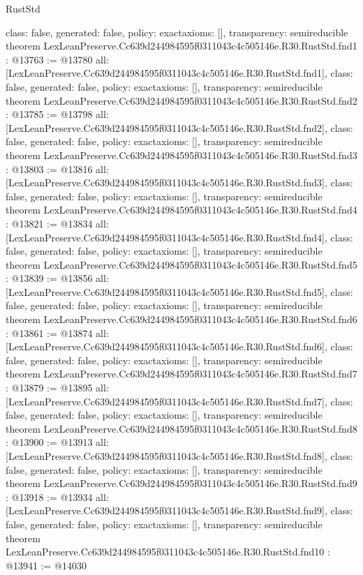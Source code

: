 \begin{lexlean}{RustStd}
\begin{coremodule}
{  class: false,
  generated: false,
  policy: exact{axioms: []},
  transparency: semireducible
}
theorem LexLeanPreserve.Cc639d244984595f0311043c4c505146e.R30.RustStd.fnd1 : @13763 := @13780 {
  all: [LexLeanPreserve.Cc639d244984595f0311043c4c505146e.R30.RustStd.fnd1],
  class: false,
  generated: false,
  policy: exact{axioms: []},
  transparency: semireducible
}
theorem LexLeanPreserve.Cc639d244984595f0311043c4c505146e.R30.RustStd.fnd2 : @13785 := @13798 {
  all: [LexLeanPreserve.Cc639d244984595f0311043c4c505146e.R30.RustStd.fnd2],
  class: false,
  generated: false,
  policy: exact{axioms: []},
  transparency: semireducible
}
theorem LexLeanPreserve.Cc639d244984595f0311043c4c505146e.R30.RustStd.fnd3 : @13803 := @13816 {
  all: [LexLeanPreserve.Cc639d244984595f0311043c4c505146e.R30.RustStd.fnd3],
  class: false,
  generated: false,
  policy: exact{axioms: []},
  transparency: semireducible
}
theorem LexLeanPreserve.Cc639d244984595f0311043c4c505146e.R30.RustStd.fnd4 : @13821 := @13834 {
  all: [LexLeanPreserve.Cc639d244984595f0311043c4c505146e.R30.RustStd.fnd4],
  class: false,
  generated: false,
  policy: exact{axioms: []},
  transparency: semireducible
}
theorem LexLeanPreserve.Cc639d244984595f0311043c4c505146e.R30.RustStd.fnd5 : @13839 := @13856 {
  all: [LexLeanPreserve.Cc639d244984595f0311043c4c505146e.R30.RustStd.fnd5],
  class: false,
  generated: false,
  policy: exact{axioms: []},
  transparency: semireducible
}
theorem LexLeanPreserve.Cc639d244984595f0311043c4c505146e.R30.RustStd.fnd6 : @13861 := @13874 {
  all: [LexLeanPreserve.Cc639d244984595f0311043c4c505146e.R30.RustStd.fnd6],
  class: false,
  generated: false,
  policy: exact{axioms: []},
  transparency: semireducible
}
theorem LexLeanPreserve.Cc639d244984595f0311043c4c505146e.R30.RustStd.fnd7 : @13879 := @13895 {
  all: [LexLeanPreserve.Cc639d244984595f0311043c4c505146e.R30.RustStd.fnd7],
  class: false,
  generated: false,
  policy: exact{axioms: []},
  transparency: semireducible
}
theorem LexLeanPreserve.Cc639d244984595f0311043c4c505146e.R30.RustStd.fnd8 : @13900 := @13913 {
  all: [LexLeanPreserve.Cc639d244984595f0311043c4c505146e.R30.RustStd.fnd8],
  class: false,
  generated: false,
  policy: exact{axioms: []},
  transparency: semireducible
}
theorem LexLeanPreserve.Cc639d244984595f0311043c4c505146e.R30.RustStd.fnd9 : @13918 := @13934 {
  all: [LexLeanPreserve.Cc639d244984595f0311043c4c505146e.R30.RustStd.fnd9],
  class: false,
  generated: false,
  policy: exact{axioms: []},
  transparency: semireducible
}
theorem LexLeanPreserve.Cc639d244984595f0311043c4c505146e.R30.RustStd.fnd10 : @13941 := @14030 {
}
\end{coremodule}
\end{lexlean}
